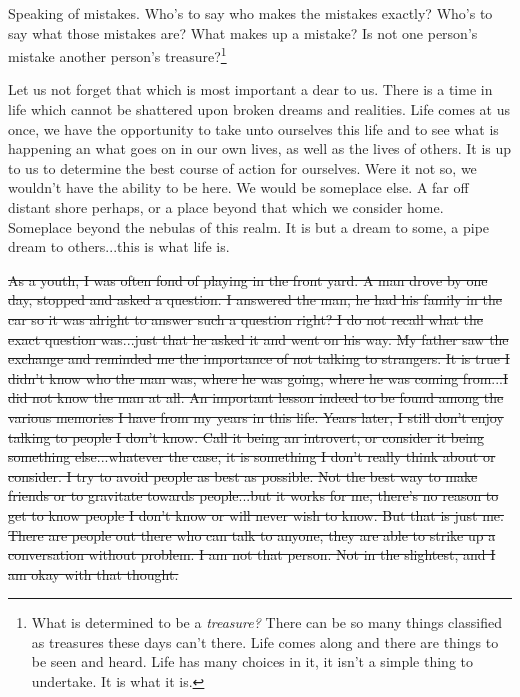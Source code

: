 Speaking of mistakes. Who's to say who makes the mistakes exactly? Who's to say
what those mistakes are? What makes up a mistake? Is not one person's mistake
another person's treasure?\footnote{What is determined to be a \textit{treasure?} 
There can be so many things classified as treasures these days can't there. Life 
comes along and there are things to be seen and heard. Life has many choices in 
it, it isn't a simple thing to undertake. It is what it is.}

Let us not forget that which is most important a dear to us. There is a time in
life which cannot be shattered upon broken dreams and realities. Life comes at
us once, we have the opportunity to take unto ourselves this life and to see
what is happening an what goes on in our own lives, as well as the lives of
others. It is up to us to determine the best course of action for ourselves.
Were it not so, we wouldn't have the ability to be here. We would be someplace
else. A far off distant shore perhaps, or a place beyond that which we consider
home. Someplace beyond the nebulas of this realm. It is but a dream to some, a
pipe dream to others...this is what life is.

\st{As a youth, I was often fond of playing in the front yard. A man drove by
one day, stopped and asked a question. I answered the man, he had his family in
the car so it was alright to answer such a question right? I do not recall what
the exact question was...just that he asked it and went on his way. My father
saw the exchange and reminded me the importance of not talking to strangers. It
is true I didn't know who the man was, where he was going, where he was coming 
from...I did not know the man at all. An important lesson indeed to be found
among the various memories I have from my years in this life. Years later, I
still don't enjoy talking to people I don't know. Call it being an introvert,
or consider it being something else...whatever the case, it is something I don't
really think about or consider. I try to avoid people as best as possible. Not
the best way to make friends or to gravitate towards people...but it works for 
me, there's no reason to get to know people I don't know or will never wish to
know. But that is just me. There are people out there who can talk to anyone, 
they are able to strike up a conversation without problem. I am not that person.
Not in the slightest, and I am okay with that thought.}

